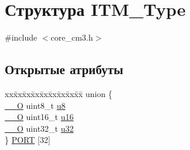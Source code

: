 \hypertarget{struct_i_t_m___type}{}\section{Структура I\+T\+M\+\_\+\+Type}
\label{struct_i_t_m___type}


{\ttfamily \#include $<$core\+\_\+cm3.\+h$>$}

\subsection*{Открытые атрибуты}
\begin{DoxyCompactItemize}
\item 
\begin{tabbing}
xx\=xx\=xx\=xx\=xx\=xx\=xx\=xx\=xx\=\kill
union \{\\
\>\mbox{\hyperlink{group___c_m_s_i_s___c_m3__core__definitions_ga7e25d9380f9ef903923964322e71f2f6}{\_\_O}} uint8\_t \mbox{\hyperlink{struct_i_t_m___type_abea77b06775d325e5f6f46203f582433}{u8}}\\
\>\mbox{\hyperlink{group___c_m_s_i_s___c_m3__core__definitions_ga7e25d9380f9ef903923964322e71f2f6}{\_\_O}} uint16\_t \mbox{\hyperlink{struct_i_t_m___type_a12aa4eb4d9dcb589a5d953c836f4e8f4}{u16}}\\
\>\mbox{\hyperlink{group___c_m_s_i_s___c_m3__core__definitions_ga7e25d9380f9ef903923964322e71f2f6}{\_\_O}} uint32\_t \mbox{\hyperlink{struct_i_t_m___type_a6882fa5af67ef5c5dfb433b3b68939df}{u32}}\\
\} \mbox{\hyperlink{struct_i_t_m___type_a39a41c83803bf267d48b8fe6679dc854}{PORT}} \mbox{[}32\mbox{]}\\


\end{tabbing}
\end{DoxyCompactItemize}
